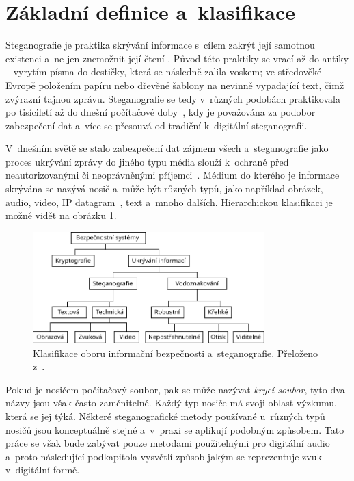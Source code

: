 \section{Základní definice a~klasifikace}
\label{sec:definitions}

Steganografie je praktika skrývání informace s~cílem zakrýt její samotnou
existenci a~ne jen znemožnit její čtení
\cite{AlSabhany2020}\cite{Anderson1998}\cite{Djebbar2012}\cite{Dutta2020}.
Původ této praktiky se vrací až do antiky -- vyrytím písma do destičky, která
se následně zalila voskem; ve středověké Evropě položením papíru nebo dřevěné
šablony na nevinně vypadající text, čímž zvýrazní tajnou zprávu. Steganografie
se tedy v~různých podobách praktikovala po tisíciletí až do dnešní počítačové
doby~\cite{Anderson1998}, kdy je považována za podobor zabezpečení dat
\cite{Djebbar2012} a~více se přesouvá od tradiční k~digitální steganografii.

V~dnešním světě se stalo zabezpečení dat zájmem všech a~steganografie jako
proces ukrývání zprávy do jiného typu média slouží k~ochraně před
neautorizovanými či neoprávněnými příjemci~\cite{Dutta2020}. Médium do kterého
je informace skrývána se nazývá nosič a~může být různých typů, jako například
obrázek, audio, video, IP datagram~\cite{Dutta2020}, text a~mnoho dalších.
Hierarchickou klasifikaci je možné vidět na obrázku
\ref{pic:steganography-classification}.

\begin{figure}[hbt]
    \centering
    \includegraphics[width=0.8\textwidth]{obrazky/steganography-classification.pdf}
    \caption{Klasifikace oboru informační bezpečnosti a~steganografie.
    Přeloženo z~\cite{Majeed2021}.}
    \label{pic:steganography-classification}
\end{figure}

Pokud je nosičem počítačový soubor, pak se může nazývat \textit{krycí soubor},
tyto dva názvy jsou však často zaměnitelné. Každý typ nosiče má svoji oblast
výzkumu, která se jej týká. Některé steganografické metody používané u~různých
typů nosičů jsou konceptuálně stejné a~v~praxi se aplikují podobným způsobem.
Tato práce se však bude zabývat pouze metodami použitelnými pro digitální
audio a~proto následující podkapitola vysvětlí způsob jakým se reprezentuje
zvuk v~digitální formě.

